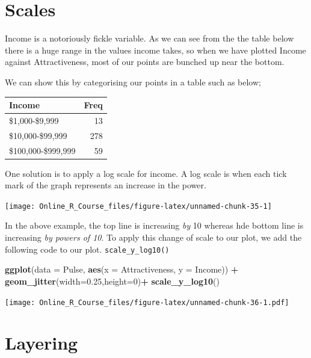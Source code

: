 \documentclass[]{book}
\newenvironment{Shaded}{\begin{snugshade}}{\end{snugshade}}
\newcommand{\DataTypeTok}[1]{\textcolor[rgb]{0.13,0.29,0.53}{#1}}
\newcommand{\DecValTok}[1]{\textcolor[rgb]{0.00,0.00,0.81}{#1}}
\newcommand{\FloatTok}[1]{\textcolor[rgb]{0.00,0.00,0.81}{#1}}
\newcommand{\KeywordTok}[1]{\textcolor[rgb]{0.13,0.29,0.53}{\textbf{#1}}}
\newcommand{\NormalTok}[1]{#1}
\newcommand{\OperatorTok}[1]{\textcolor[rgb]{0.81,0.36,0.00}{\textbf{#1}}}
\newcommand{\StringTok}[1]{\textcolor[rgb]{0.31,0.60,0.02}{#1}}
\begin{document}
\hypertarget{scales}{%
\section{Scales}\label{scales}}

Income is a notoriously fickle variable. As we can see from the the table below there is a huge range in the values income takes, so when we have plotted Income against Attractiveness, most of our points are bunched up near the bottom.

We can show this by categorising our points in a table such as below;

\begin{tabular}{lr}
\toprule
Income & Freq\\
\midrule
\$1,000-\$9,999 & 13\\
\$10,000-\$99,999 & 278\\
\$100,000-\$999,999 & 59\\
\bottomrule
\end{tabular}

One solution is to apply a log scale for income. A log scale is when each tick mark of the graph represents an increase in the power.

\begin{center}\texttt{[image: Online\_R\_Course\_files/figure-latex/unnamed-chunk-35-1]} \end{center}

In the above example, the top line is increasing \emph{by} 10 whereas hde bottom line is increasing \emph{by powers of 10}. To apply this change of scale to our plot, we add the following code to our plot. \texttt{scale\_y\_log10()}

\begin{Shaded}
\begin{Highlighting}[]
\KeywordTok{ggplot}\NormalTok{(}\DataTypeTok{data =}\NormalTok{ Pulse,  }\KeywordTok{aes}\NormalTok{(}\DataTypeTok{x =}\NormalTok{ Attractiveness, }\DataTypeTok{y =}\NormalTok{ Income)) }\OperatorTok{+}\StringTok{ }
\StringTok{  }\KeywordTok{geom_jitter}\NormalTok{(}\DataTypeTok{width=}\FloatTok{0.25}\NormalTok{,}\DataTypeTok{height=}\DecValTok{0}\NormalTok{)}\OperatorTok{+}
\StringTok{    }\KeywordTok{scale_y_log10}\NormalTok{()}
\end{Highlighting}
\end{Shaded}

\texttt{[image: Online\_R\_Course\_files/figure-latex/unnamed-chunk-36-1.pdf]}

\hypertarget{layering}{%
\section{Layering}\label{layering}}
\end{document}
